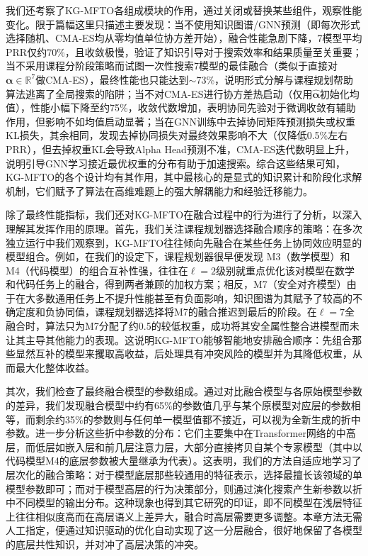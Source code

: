 \documentclass[../main.tex]{subfiles}
\begin{document}
我们还考察了KG-MFTO各组成模块的作用，通过关闭或替换某些组件，观察性能变化。限于篇幅这里只描述主要发现：当不使用知识图谱/GNN预测（即每次形式选择随机、CMA-ES均从零均值单位协方差开始），融合性能急剧下降，7模型平均PRR仅约70\%，且收敛极慢，验证了知识引导对于搜索效率和结果质量至关重要；当不采用课程分阶段策略而试图一次性搜索7模型的最佳融合（类似于直接对$\boldsymbol{\alpha}\in \mathbb{R}^7$做CMA-ES），最终性能也只能达到$\sim$73\%，说明形式分解与课程规划帮助算法逃离了全局搜索的陷阱；当不对CMA-ES进行协方差热启动（仅用$\hat{\boldsymbol{\alpha}}$初始化均值），性能小幅下降至约75\%，收敛代数增加，表明协同先验对于微调收敛有辅助作用，但影响不如均值启动显著；当在GNN训练中去掉协同矩阵预测损失或权重KL损失，其余相同，发现去掉协同损失对最终效果影响不大（仅降低0.5\%左右PRR），但去掉权重KL会导致Alpha Head预测不准，CMA-ES迭代数明显上升，说明引导GNN学习接近最优权重的分布有助于加速搜索。综合这些结果可知，KG-MFTO的各个设计均有其作用，其中最核心的是显式的知识累计和阶段化求解机制，它们赋予了算法在高维难题上的强大解耦能力和经验迁移能力。

\label{sec:ch5-6-4-closed-loop-fusion-analysis}

除了最终性能指标，我们还对KG-MFTO在融合过程中的行为进行了分析，以深入理解其发挥作用的原理。首先，我们关注课程规划器选择融合顺序的策略：在多次独立运行中我们观察到，KG-MFTO往往倾向先融合在某些任务上协同效应明显的模型组合。例如，在我们的设定下，课程规划器很早便发现 M3（数学模型）和 M4（代码模型）的组合互补性强，往往在$\ell=2$级别就重点优化该对模型在数学和代码任务上的融合，得到两者兼顾的加权方案；相反，M7（安全对齐模型）由于在大多数通用任务上不提升性能甚至有负面影响，知识图谱为其赋予了较高的不确定度和负协同值，课程规划器选择将M7的融合推迟到最后的阶段。在$\ell=7$全融合时，算法只为M7分配了约0.5的较低权重，成功将其安全属性整合进模型而未让其主导其他能力的表现。这说明KG-MFTO能够智能地安排融合顺序：先组合那些显然互补的模型来攫取高收益，后处理具有冲突风险的模型并为其降低权重，从而最大化整体收益。

其次，我们检查了最终融合模型的参数组成。通过对比融合模型与各原始模型参数的差异，我们发现融合模型中约有65\%的参数值几乎与某个原模型对应层的参数相等，而剩余约35\%的参数则与任何单一模型值都不接近，可以视为全新生成的折中参数。进一步分析这些折中参数的分布：它们主要集中在Transformer网络的中高层，而低层如嵌入层和前几层注意力层，大部分直接拷贝自某个专家模型（其中以代码模型M4的底层参数被大量继承为代表）。这表明，我们的方法自适应地学习了层次化的融合策略：对于模型底层那些较通用的特征表示，选择最擅长该领域的单模型参数即可；而对于模型高层的行为决策部分，则通过演化搜索产生新参数以折中不同模型的输出分布。这种现象也得到其它研究的印证，即不同模型在浅层特征上往往相似度高而在高层语义上差异大，融合时高层需要更多调整。本章方法无需人工指定，便通过知识驱动的优化自动实现了这一分层融合，很好地保留了各模型的底层共性知识，并对冲了高层决策的冲突。
\end{document}
